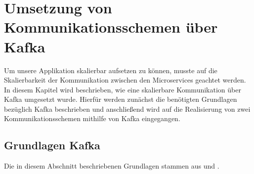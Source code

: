 \chapter{Umsetzung von Kommunikationsschemen über Kafka} 
\label{chap:Kafka}
\newcommand{\C}{\textit{Consumer}}
\newcommand{\Cn}{\textit{Consumern}}
\newcommand{\CG}{\textit{Consumer Group}}
\newcommand{\CGs}{\textit{Consumer Groups}}
\newcommand{\T}{\textit{Topic}}
\newcommand{\Tcs}{\textit{Topics}}
\newcommand{\Pt}{\textit{Partition}}
\newcommand{\Pts}{\textit{Partitionen}}
\newcommand{\Pd}{\textit{Producer}}
\newcommand{\Evs}{\textit{Events}}
\newcommand{\Ev}{\textit{Event}}
Um unsere Applikation skalierbar aufsetzen zu können, musste auf die Skalierbarkeit der Kommunikation zwischen den Microservices geachtet werden. In diesem Kapitel wird beschrieben, wie eine skalierbare Kommunikation über Kafka umgesetzt wurde. Hierfür werden zunächst die benötigten Grundlagen bezüglich Kafka beschrieben und anschließend wird auf die Realisierung von zwei Kommunikationsschemen mithilfe von Kafka eingegangen.
\section{Grundlagen Kafka}
Die in diesem Abschnitt beschriebenen Grundlagen stammen aus \cite{KafkaIntro} und \cite{KafkaDoku}.
